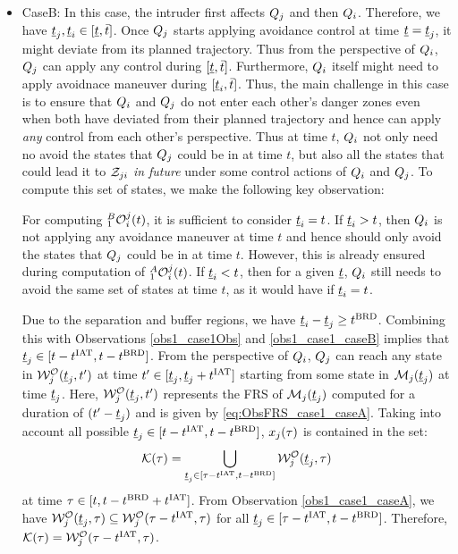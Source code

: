 \begin{itemize}[leftmargin=*]
\item \label{sec:intruderObs_case1_caseB} CaseB: In this case, the intruder first affects $Q_j$ and then $Q_i$. Therefore, we have $\underline{t}_j, \underline{t}_i \in [\underline{t}, \bar{t}]$. Once $Q_j$ starts applying avoidance control at time $\underline{t} = \underline{t}_j$, it might deviate from its planned trajectory. Thus from the perspective of $Q_i$, $Q_j$ can apply any control during $[\underline{t}, \bar{t}]$. Furthermore, $Q_i$ itself might need to apply avoidnace maneuver during $[\underline{t}_i, \bar{t}]$. Thus, the main challenge in this case is to ensure that $Q_i$ and $Q_j$ do not enter each other's danger zones even when both have deviated from their planned trajectory and hence can apply \textit{any} control from each other's perspective. Thus at time $t$, $Q_i$ not only need no avoid the states that $Q_j$ could be in at time $t$, but also all the states that could lead it to $\mathcal{Z}_{ji}$ \textit{in future} under some control actions of $Q_i$ and $Q_j$. To compute this set of states, we make the following key observation:
\begin{observation} \label{obs1_case1_caseB}
For computing $_1^B\mathcal{O}_i^j(t)$, it is sufficient to consider $\underline{t}_i = t$. If $\underline{t}_i > t$, then $Q_i$ is not applying any avoidance maneuver at time $t$ and hence should only avoid the states that $Q_j$ could be in at time $t$. However, this is already ensured during computation of $_1^A\mathcal{O}_i^j(t)$. If $\underline{t}_i < t$, then for a given $\underline{t}$, $Q_i$ still needs to avoid the same set of states at time $t$, as it would have if $\underline{t}_i = t$.  
\end{observation}

Due to the separation and buffer regions, we have $\underline{t}_i - \underline{t}_j \geq t^\text{BRD}$. Combining this with Observations \ref{obs1_case1Obs} and \ref{obs1_case1_caseB} implies that $\underline{t}_j \in [t-t^\text{IAT}, t-t^\text{BRD}]$. From the perspective of $Q_i$, $Q_j$ can reach any state in $\mathcal{W}_{j}^{\mathcal{O}}(\underline{t}_j, t')$ at time $t' \in [\underline{t}_j, \underline{t}_j+t^\text{IAT}]$ starting from some state in $\mathcal{M}_j(\underline{t}_j)$ at time $\underline{t}_j$. Here, $\mathcal{W}_{j}^{\mathcal{O}}(\underline{t}_j, t')$ represents the FRS of $\mathcal{M}_j(\underline{t}_j)$ computed for a duration of $(t' - \underline{t}_j)$ and is given by \eqref{eq:ObsFRS_case1_caseA}. Taking into account all possible $\underline{t}_j \in [t-t^\text{IAT}, t-t^\text{BRD}]$, $x_j(\tau)$ is contained in the set:
\begin{equation}
\mathcal{K}(\tau) = \bigcup_{\underline{t}_j \in [\tau-t^\text{IAT}, t-t^\text{BRD}]} \mathcal{W}_{j}^{\mathcal{O}}(\underline{t}_j, \tau)
\end{equation} 
at time $\tau \in [t, t-t^\text{BRD}+t^\text{IAT}]$. From Observation \ref{obs1_case1_caseA}, we have $\mathcal{W}_{j}^{\mathcal{O}}(\underline{t}_j, \tau) \subseteq \mathcal{W}_{j}^{\mathcal{O}}(\tau-t^\text{IAT}, \tau)$ for all $\underline{t}_j \in [\tau-t^\text{IAT}, t-t^\text{BRD}]$. Therefore, $\mathcal{K}(\tau) = \mathcal{W}_{j}^{\mathcal{O}}(\tau-t^\text{IAT}, \tau)$.


\end{itemize}
